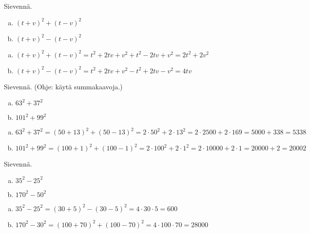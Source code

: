 \begin{tehtava}
    Sievennä.
    \begin{enumerate}[a)]
        \item $(t+v)^2+(t-v)^2$
        \item $(t+v)^2-(t-v)^2$
    \end{enumerate}
    \begin{vastaus}
        \begin{enumerate}[a)]
            \item $(t+v)^2+(t-v)^2 = t^2+2tv+v^2+t^2-2tv+v^2 = 2t^2+2v^2$
            \item $(t+v)^2-(t-v)^2 = t^2+2tv+v^2-t^2+2tv-v^2 = 4tv$
        \end{enumerate}
    \end{vastaus}
\end{tehtava}

\begin{tehtava}
    Sievennä. (Ohje: käytä summakaavoja.)
    \begin{enumerate}[a)]
        \item $63^2+37^2$
        \item $101^2+99^2$
    \end{enumerate}
    \begin{vastaus}
        \begin{enumerate}[a)]
            \item $63^2+37^2 = (50+13)^2+(50-13)^2 = 2\cdot 50^2 + 2\cdot 13^2 = 2\cdot 2500 +2\cdot 169 = 5000 + 338 = 5338$
            \item $101^2+99^2 = (100+1)^2+(100-1)^2 = 2\cdot 100^2 + 2\cdot 1^2 = 2\cdot 10000 + 2\cdot 1 = 20000 + 2 = 20002$
        \end{enumerate}
    \end{vastaus}
\end{tehtava}

\begin{tehtava}
    Sievennä.
    \begin{enumerate}[a)]
        \item $35^2-25^2$
        \item $170^2-50^2$
    \end{enumerate}
    \begin{vastaus}
        \begin{enumerate}[a)]
            \item $35^2-25^2 = (30+5)^2-(30-5)^2 = 4\cdot 30\cdot 5 = 600$
            \item $170^2-30^2 = (100+70)^2+(100-70)^2 = 4\cdot 100\cdot 70 = 28000$
        \end{enumerate}
    \end{vastaus}
\end{tehtava}

